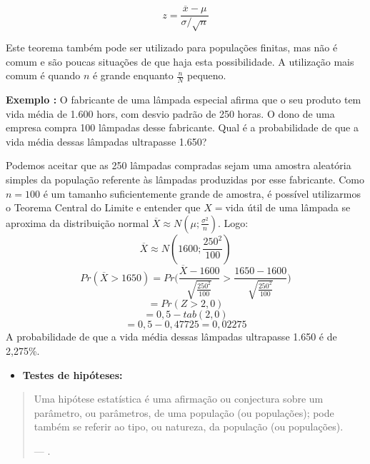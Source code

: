 \documentclass[
]{book}
\providecommand{\tightlist}{%
  \setlength{\itemsep}{0pt}\setlength{\parskip}{0pt}}
\begin{document}
\begin{equation} 
 z=\frac{\overline{x}-\mu}{\sigma / \sqrt{n}}
  \label{eq:teoremacentralimite}
\end{equation}

Este teorema também pode ser utilizado para populações finitas, mas não é comum e são poucas situações de que haja esta possibilidade. A utilização mais comum é quando \(n\) é grande enquanto \(\frac{n}{N}\) pequeno.

\textbf{Exemplo \citep{fariaestatistic}:} O fabricante de uma lâmpada especial afirma que o seu produto tem vida média de 1.600 hors, com desvio padrão de 250 horas. O dono de uma empresa compra 100 lâmpadas desse fabricante. Qual é a probabilidade de que a vida média dessas lâmpadas ultrapasse 1.650?

Podemos aceitar que as 250 lâmpadas compradas sejam uma amostra aleatória simples da população referente às lâmpadas produzidas por esse fabricante. Como \(n=100\) é um tamanho suficientemente grande de amostra, é possível utilizarmos o Teorema Central do Limite e entender que \(X=\)vida útil de uma lâmpada se aproxima da distribuição normal \(\overline{X}\approx N(\mu;\frac{\sigma^2}{n})\). Logo:
\[\overline{X}\approx N(1600;\frac{250^2}{100})\]
\[Pr(\overline{X}>1650)=Pr\bigg( \frac{\overline{X}-1600}{\sqrt{\frac{250^2}{100}}}>\frac{1650-1600}{\sqrt{\frac{250^2}{100}}} \bigg)\]
\[=Pr(Z>2,0)\]
\[=0,5-tab(2,0)\]
\[=0,5-0,47725=0,02275\]
A probabilidade de que a vida média dessas lâmpadas ultrapasse 1.650 é de 2,275\%.

\begin{itemize}
\tightlist
\item
  \textbf{Testes de hipóteses:}
\end{itemize}

\begin{quote}
Uma hipótese estatística é uma afirmação ou conjectura sobre um parâmetro, ou parâmetros, de uma população (ou populações); pode também se referir ao tipo, ou natureza, da população (ou populações).

--- \citet{freund2009estatistica}.
\end{quote}
\end{document}
